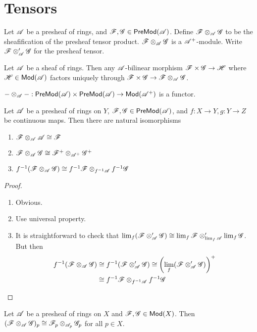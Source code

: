 \documentclass{memoir}
\begin{document}
\section{Tensors}
\begin{definition}
    Let $\mathscr{A}$ be a presheaf of rings, and $\mathscr{F},\mathscr{G}\in{\normalfont\mathsf{PreMod}}(\mathscr{A})$.
    Define $\mathscr{F}\otimes_{\mathscr{A}}\mathscr{G}$ to be the sheafification of the presheaf tensor product.
    $\mathscr{F}\otimes_{\mathscr{A}}\mathscr{G}$ is a $\mathscr{A}^+$-module.
    Write $\mathscr{F}\otimes_{\mathscr{A}}'\mathscr{G}$ for the presheaf tensor.
\end{definition}
\begin{thm}
    Let $\mathscr{A}$ be a sheaf of rings.
    Then any $\mathscr{A}$-bilinear morphism $\mathscr{F}\times\mathscr{G}\to \mathscr{H}$ where $\mathscr{H}\in{\normalfont\mathsf{Mod}}(\mathscr{A})$ factors uniquely through $\mathscr{F}\times\mathscr{G}\to \mathscr{F}\otimes_{\mathscr{A}}\mathscr{G}$.
\end{thm}
\begin{thm}
    $-\otimes_{\mathscr{A}}-:{\normalfont\mathsf{PreMod}}(\mathscr{A})\times{\normalfont\mathsf{PreMod}}(\mathscr{A})\to {\normalfont\mathsf{Mod}}(\mathscr{A}^+)$ is a functor.
\end{thm}
\begin{proposition}
    Let $\mathscr{A}$ be a presheaf of rings on $Y$, $\mathscr{F}, \mathscr{G}\in {\normalfont\mathsf{PreMod}}(\mathscr{A})$, and $f:X\to Y, g:Y\to Z$ be continuous maps.
    Then there are natural isomorphisms
    \begin{enumerate}
        \item $\mathscr{F}\otimes_{\mathscr{A}}\mathscr{A} \cong \mathscr{F}$
        \item $\mathscr{F}\otimes_{\mathscr{A}}\mathscr{G} \cong \mathscr{F}^+\otimes_{\mathscr{A}^+}\mathscr{G}^+$
        \item $f^{-1}(\mathscr{F}\otimes_{\mathscr{A}}\mathscr{G}) \cong f^{-1}\mathscr{F}\otimes_{f^{-1}\mathscr{A}}f^{-1}\mathscr{G}$
    \end{enumerate}
\end{proposition}
\begin{proof}
    \begin{enumerate}
        \item Obvious.
        \item Use universal property.
        \item It is straightforward to check that $\lim_f(\mathscr{F}\otimes_{\mathscr{A}}' \mathscr{G}) \cong \lim_f\mathscr{F}\otimes_{\lim_f\mathscr{A}}'\lim_f\mathscr{G}$.
            But then
            \begin{align}
                f^{-1}(\mathscr{F}\otimes_{\mathscr{A}}\mathscr{G}) &\cong f^{-1}(\mathscr{F}\otimes_{\mathscr{A}}'\mathscr{G}) \cong \left(\lim_f(\mathscr{F}\otimes_{\mathscr{A}}'\mathscr{G})\right)^+ \nonumber \\
                                                     &\cong f^{-1}\mathscr{F}\otimes_{f^{-1}\mathscr{A}}f^{-1}\mathscr{G}
            \end{align}
    \end{enumerate}
\end{proof}
\begin{proposition}
    Let $\mathscr{A}$ be a presheaf of rings on $X$ and $\mathscr{F},\mathscr{G}\in {\normalfont\mathsf{Mod}}(X)$. 
    Then $(\mathscr{F}\otimes_{\mathscr{A}}\mathscr{G})_p \cong \mathscr{F}_p\otimes_{\mathscr{A}_p}\mathscr{G}_p$ for all $p\in X$.
\end{proposition}
\end{document}
